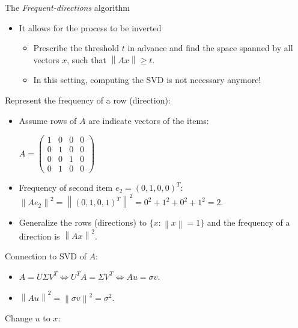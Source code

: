 \documentclass[first=dgreen,second=purple,logo=redque]{aaltoslides}
\newcommand{\vectornorm}[1]{\left\|#1\right\|}
\begin{document}

\begin{frame}[allowframebreaks=1]{The \textit{Frequent-directions} algorithm}

\begin{itemize}
  \item It allows for the process to be inverted
  \begin{itemize}
    \item Prescribe the threshold $t$ in advance and find the space spanned by all
vectors $x$, such that $\vectornorm{Ax} \geq t$.
    \item In this setting, computing the SVD is not necessary anymore!
   \end{itemize}
\end{itemize}

\framebreak
Represent the frequency of a row (direction):
\begin{itemize}
  \item Assume rows of $A$ are indicate vectors of the items: \\
  \begin{center}
  \vspace{2 mm}
  $A = \begin{pmatrix}
       1 & 0 & 0 & 0\\[0.3em] 
       0 & 1 & 0 & 0\\[0.3em]
       0 & 0 & 1 & 0\\[0.3em]
       0 & 1 & 0 & 0
     \end{pmatrix}$
  \end{center}
  \item Frequency of second item $e_2 = (0,1,0,0)^T$:
  $ \vectornorm{Ae_2}^2 = \vectornorm{(0,1,0,1)^T} ^2= 0^2 + 1^2 + 0^2 + 1^2 = 2$. 
  \item Generalize the rows (directions) to $\{x : \vectornorm{x}=1\} $ and the frequency of a direction is $\vectornorm{Ax}^2$.
\end{itemize}

\framebreak
Connection to SVD of $A$:
\begin{itemize}
  \item $A = U\Sigma V^T \Leftrightarrow U^TA = \Sigma V^T \Leftrightarrow Au = \sigma v$.
  \item $\vectornorm{Au}^2 = \vectornorm{\sigma v}^2 = \sigma^2$.
\end{itemize}
  \vspace{2 mm}
Change $u$ to $x$: \\
  \vspace{2 mm}


\end{frame}
\end{document}
